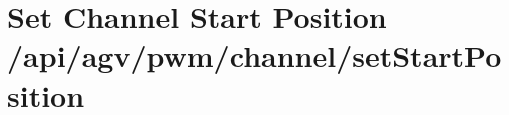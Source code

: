 \documentclass[letterpaper,10pt,english]{sphinxmanual}
\begin{document}
\begin{sphinxVerbatim}[commandchars=\\\{\}]
\end{sphinxVerbatim}


\section{Set Channel Start Position \textendash{} /api/agv/pwm/channel/setStartPosition}
\label{\detokenize{agv_rest_api_pwm:set-channel-start-position-api-agv-pwm-channel-setstartposition}}\label{\detokenize{agv_rest_api_pwm:post-api-agv-pwm-channel-setstartposition}}
\end{document}
